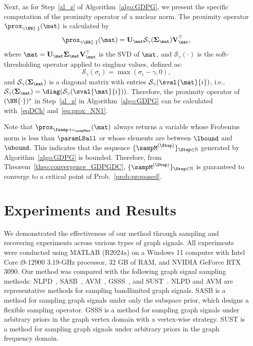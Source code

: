 \documentclass[journal]{IEEEtran}
\begin{document}
Next, as for Step~\ref{al_z} of Algorithm~\ref{algo:GDPG}, we present the specific computation of the proximity operator of a nuclear norm.
The proximity operator $\prox_{\gamma\NN{\cdot}}(\mat)$ is calculated by
\begin{equation}
  \label{eq:prox_NN1}
  \prox_{\gamma\NN{\cdot}}(\mat)=\mathbf{U}_\mat \mathcal{S}_{\gamma}(\mathbf{\Sigma}_{\mat}) \mathbf{V}_\mat^\top,
\end{equation}
where $\mat = \mathbf{U}_{\mat} \mathbf{\Sigma}_{\mat} \mathbf{V}_{\mat}^\top$ is the SVD of $\mat$, and $\mathcal{S}_{\gamma}(\cdot)$ is the soft-thresholding operator applied to singluar values, defined as:
\begin{equation}
  \mathcal{S}_{\gamma}(\sigma_i) = \max(\sigma_i - \gamma, 0),
\end{equation}
and $\mathcal{S}_{\gamma}(\mathbf{\Sigma}_{\mat})$ is a diagonal matrix with entries $\mathcal{S}_{\gamma}(\sval{\mat}{i})$, i.e., $\mathcal{S}_{\gamma}(\mathbf{\Sigma}_{\mat}) = \diag(\mathcal{S}_{\gamma}(\sval{\mat}{i}))$.
Therefore, the proximity operator of $(\NN{\cdot})^{*}$ in Step~\ref{al_z} in Algorithm~\ref{algo:GDPG} can be calculated with~\eqref{eqDCh} and~\eqref{eq:prox_NN1}.



\begin{rem}
\rm{Note that $\prox_{\fsamp + \iota_{\sampMSet}}(\mat)$ always returns a variable whose Frobenius norm is less than $\paramLBall$ or whose elements are between $\lbound$ and $\ubound$.
This indicates that the sequence $\{\sampM^{(\Step)}\}_{\Step \in \mathbb{N}}$ generated by Algorithm~\ref{algo:GDPG} is bounded.
Therefore, from Theorem~\ref{theo:convergence_GDPGDC}, $\{\sampM^{(\Step)}\}_{\Step \in \mathbb{N}}$ is guaranteed to converge to a critical point of Prob.~\eqref{prob:proposed}.}
\end{rem}

\section{Experiments and Results}
\label{sec:experiments}
We demonstrated the effectiveness of our method through sampling and recovering experiments across various types of graph signals.
All experiments were conducted using MATLAB (R2024a) on a Windows 11 computer with Intel Core i9-12900 3.19-GHz processor, 32 GB of RAM, and NVIDIA GeForce RTX 3090.
Our method was compared with the following graph signal sampling methods: NLPD~\cite{chen2015discrete}, SASB~\cite{hara2021design}, AVM~\cite{jayawant2022practical}, GSSS~\cite{hara2022gsss}, and SUST~\cite{hara2023graph}.
NLPD and AVM are representative methods for sampling bandlimited graph signals.
SASB is a method for sampling graph signals under only the subspace prior, which designs a flexible sampling operator.
GSSS is a method for sampling graph signals under arbitrary priors in the graph vertex domain with a vertex-wise strategy.
SUST is a method for sampling graph signals under arbitrary priors in the graph frequency domain.
\end{document}
